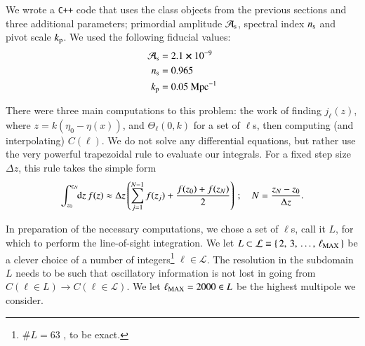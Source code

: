 




We wrote a \verb|C++| code that uses the class objects from the previous sections and three additional parameters; primordial amplitude $\mathcal{A}_\mathrm{s}$, spectral index $n_\mathrm{s}$ and pivot scale $k_\mathrm{p}$. We used the following fiducial values:
\begin{equation}
\begin{split}
    \mathcal{A}_\mathrm{s}  &=  2.1\cross 10^{-9}   \\
    n_\mathrm{s}            &=  0.965               \\
    k_\mathrm{p}            &=  0.05~\mathrm{Mpc^{-1}}
\end{split}
\end{equation}


There were three main computations to this problem: the work of finding $j_\ell(z)$, where $z= k(\eta_0-\eta(x))$, and $\Theta_\ell(0,k)$ for a set of $\ell$s, then computing (and interpolating) $C(\ell)$.
We do not solve any differential equations, but rather use the very powerful trapezoidal rule to evaluate our integrals. For a fixed step size $\Delta z$, this rule takes the simple form
\begin{equation}\label{mil4:imp:eq:trapezoidal_uniform}
    \int_{z_0}^{z_N} \!\!\mathop{}\!\mathrm{d} {z}\, f(z) \approx \Delta z \left( \sum_{j=1}^{N-1}f(z_j) + \frac{f(z_0) + f(z_{N})}{2} \right)\,; \quad N= \frac{z_N-z_0}{\Delta z}.
\end{equation}


In preparation of the necessary computations, we chose a set of $\ell$s, call it $L$, for which to perform the line-of-sight integration. We let $L\subset \mathcal{L}\equiv \{\,2,\,3,\, \dots,\,  \ell_\mathrm{MAX}\,\}$ be a clever choice of a number of integers\footnote{$\#L=63$ , to be exact.} $\ell\in \mathcal{L}$. The resolution in the subdomain $L$ needs to be such that oscillatory information is not lost in going from $C(\ell\in L)\to C(\ell\in\mathcal{L})$. We let $\ell_\mathrm{MAX}=2000 \in L$ be the highest multipole we consider. 

